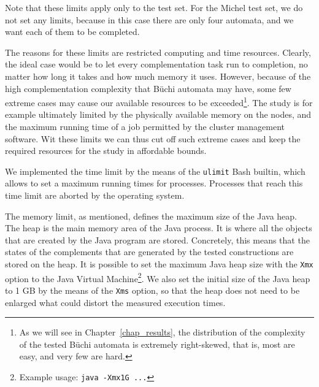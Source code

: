 Note that these limits apply only to the \goal{} test set. For the Michel test set, we do not set any limits, because in this case there are only four automata, and we want each of them to be completed.


The reasons for these limits are restricted computing and time resources. Clearly, the ideal case would be to let every complementation task run to completion, no matter how long it takes and how much memory it uses. However, because of the high complementation complexity that Büchi automata may have, some few extreme cases may cause our available resources to be exceeded\footnote{As we will see in Chapter~\ref{chap_results}, the distribution of the complexity of the tested Büchi automata is extremely right-skewed, that is, most are easy, and very few are hard.}. The study is for example ultimately limited by the physically available memory on the nodes, and the maximum running time of a job permitted by the cluster management software. Wit these limits we can thus cut off such extreme cases and keep the required resources for the study in affordable bounds.

We implemented the time limit by the means of the \texttt{ulimit} Bash builtin, which allows to set a maximum running times for processes. Processes that reach this time limit are aborted by the operating system.

The memory limit, as mentioned, defines the maximum size of the Java heap. The heap is the main memory area of the Java process. It is where all the objects that are created by the Java program are stored. Concretely, this means that the states of the complements that are generated by the tested constructions are stored on the heap. It is possible to set the maximum Java heap size with the \texttt{Xmx} option to the Java Virtual Machine\footnote{Example usage: \texttt{java -Xmx1G ...}}. We also set the initial size of the Java heap to 1 GB by the means of the \texttt{Xms} option, so that the heap does not need to be enlarged what could distort the measured execution times.

